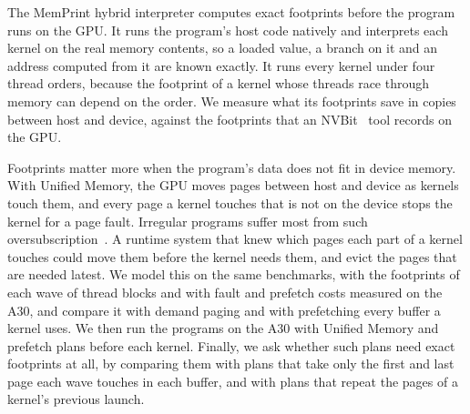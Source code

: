 \documentclass[11pt]{article}
\newcommand{\memprint}{MemPrint}
\begin{document}
The \memprint{} hybrid interpreter computes exact footprints before the program runs on the GPU. It runs the
program's host code natively and interprets each kernel on the real memory contents, so a loaded value, a branch on
it and an address computed from it are known exactly. It runs every kernel under four thread orders, because the
footprint of a kernel whose threads race through memory can depend on the order. We measure what its
footprints save in copies between host and device, against the footprints that an NVBit~\cite{Villa2019NVBit} tool
records on the GPU.

Footprints matter more when the program's data does not fit in device memory. With Unified Memory, the GPU moves
pages between host and device as kernels touch them, and every page a kernel touches that is not on the device
stops the kernel for a page fault. Irregular programs suffer most from such oversubscription~\cite{Li2019ETC}. A
runtime system that knew which pages each part of a kernel touches could move them before the kernel needs them, and
evict the pages that are needed latest. We model this on the same benchmarks, with the footprints of each wave of
thread blocks and with fault and prefetch costs measured on the A30, and compare it with demand paging and with
prefetching every buffer a kernel uses. We then run the programs on the A30 with Unified Memory and prefetch plans
before each kernel. Finally, we ask whether such plans need exact footprints at all, by comparing them with plans
that take only the first and last page each wave touches in each buffer, and with plans that repeat the pages of a
kernel's previous launch.
\end{document}
